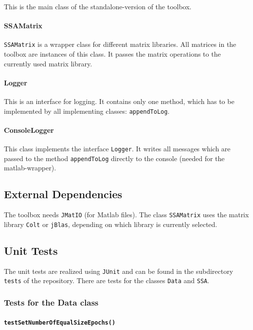 \documentclass{article}
\newcommand{\1}{\ensuremath{\mathds{1}}}
\newcommand{\0}{\ensuremath{0}}
\begin{document}
This is the main class of the standalone-version of the toolbox.

\paragraph{SSAMatrix}

\texttt{SSAMatrix} is a wrapper class for different matrix libraries. All matrices in the toolbox are instances of this class. It passes the
matrix operations to the currently used matrix library.

\paragraph{Logger}

This is an interface for logging. It contains only one method, which has to be implemented by all implementing classes: \texttt{appendToLog}.

\paragraph{ConsoleLogger}

This class implements the interface \texttt{Logger}. It writes all messages which are passed to the method
\texttt{appendToLog} directly to the console (needed for the matlab-wrapper).

\subsection*{External Dependencies}

The toolbox needs \texttt{JMatIO} (for Matlab files). The class \texttt{SSAMatrix} uses the matrix library \texttt{Colt} or \texttt{jBlas}, depending on which library
is currently selected.

\subsection*{Unit Tests}
The unit tests are realized using \texttt{JUnit} and can be found in the subdirectory \texttt{tests} of the repository.
There are tests for the classes \texttt{Data} and \texttt{SSA}.

\subsubsection*{Tests for the Data class}

\paragraph{\texttt{testSetNumberOfEqualSizeEpochs()}}
\end{document}
